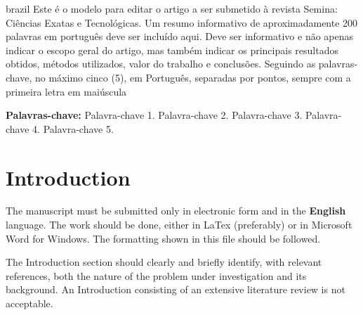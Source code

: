 \documentclass[article,10pt,twoside,a4paper,twocolumn,hidelinks,english,brazil]{abntex2}
\begin{document}
\renewcommand{\resumoname}{\texorpdfstring{\fontsize{14pt}{16.8pt} \fontfamily{ptm} \selectfont \textbf{Resumo} \\[-0.3cm] \rule{0.91\textwidth}{0.5pt} \vspace{-0.5cm}}{Resumo}}
\begin{resumoumacoluna}
    \normalsize
    \begin{otherlanguage*}{brazil}
	Este é o modelo para editar o artigo a ser submetido à revista Semina: Ciências Exatas e Tecnológicas. Um resumo informativo de aproximadamente 200 palavras em português deve ser incluído aqui. Deve ser informativo e não apenas indicar o escopo geral do artigo, mas também indicar os principais resultados obtidos, métodos utilizados, valor do trabalho e conclusões. Seguindo as palavras-chave, no máximo cinco (5), em Português, separadas por pontos, sempre com a primeira letra em maiúscula
         
				\vspace{0.15cm}
        \noindent \textbf{Palavras-chave:} Palavra-chave 1. Palavra-chave 2. Palavra-chave  3. Palavra-chave  4. Palavra-chave  5.
	
     
    \end{otherlanguage*}
\end{resumoumacoluna}
\vspace{0.3cm}




\textual
\OnehalfSpacing
\twocolumn
\pagestyle{text}


\section*{Introduction}

The manuscript must be submitted only in electronic form and in the \textbf{English} language.
The work should be done, either in LaTex (preferably) or in Microsoft Word for Windows. The formatting shown in this file should be followed.


The Introduction section should clearly and briefly identify, with relevant references, both the nature of the problem under investigation and its background. An Introduction consisting of an extensive literature review is not acceptable.
\end{document}
